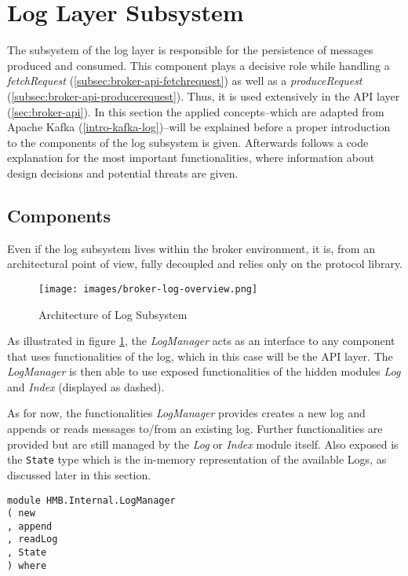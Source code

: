 \newpage
\section{Log Layer Subsystem}
\label{sec:impl-broker-log}

The subsystem of the log layer is responsible for the persistence of messages
produced and consumed. This component plays a decisive role while handling a
\textit{fetchRequest} (\ref{subsec:broker-api-fetchrequest}) as well as a
\textit{produceRequest} (\ref{subsec:broker-api-producerequest}). Thus, it is
used extensively in the API layer (\ref{sec:broker-api}). In this section the
applied concepts--which are adapted from Apache Kafka
(\ref{intro-kafka-log})--will be explained before a proper introduction to the
components of the log subsystem is given. Afterwards follows a code explanation
for the most important functionalities, where information about design
decisions and potential threats are given.

\subsection{Components}

Even if the log subsystem lives within the broker environment, it is, from an
architectural point of view, fully decoupled and relies only on the protocol
library.

\begin{figure}[H]
    \centering
    \texttt{[image: images/broker-log-overview.png]}
    \caption{Architecture of Log Subsystem}
    \label{fig:broker-log-overview}
\end{figure}

As illustrated in figure \ref{fig:broker-log-overview}, the \textit{LogManager}
acts as an interface to any component that uses functionalities of the log,
which in this case will be the API layer. The \textit{LogManager} is then able
to use exposed functionalities of the hidden modules \textit{Log} and
\textit{Index} (displayed as dashed). 

As for now, the functionalities \textit{LogManager} provides creates a new log
and appends or reads messages to/from an existing log. Further functionalities
are provided but are still managed by the \textit{Log} or \textit{Index} module
itself. Also exposed is the \lstinline{State} type which is the in-memory representation
of the available Logs, as discussed later in this section.

\begin{lstlisting}
module HMB.Internal.LogManager
( new
, append
, readLog
, State
) where
\end{lstlisting}

